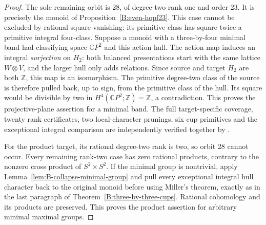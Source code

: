 \begin{proof}
The sole remaining orbit is 28, of degree-two rank one and order
23.  It is precisely the monoid of Proposition~\ref{B:even-hopf23}.
This case cannot be excluded by rational square-vanishing: its
primitive class has square twice a primitive integral four-class.
Suppose a monoid with a three-by-four minimal band had classifying
space $\mathbb CP^2$ and this action hull.  The action map induces
an integral \emph{surjection} on $H_2$: both balanced presentations
start with the same lattice $W\otimes V$, and the larger hull only
adds relations.  Since source and target $H_2$ are both $\mathbb Z$,
this map is an isomorphism.  The primitive degree-two class of the
source is therefore pulled back, up to sign, from the primitive
class of the hull.  Its square would be divisible by two in
$H^4(\mathbb CP^2;\mathbb Z)=\mathbb Z$, a contradiction.
This proves the projective-plane assertion for a minimal band.
The full target-specific coverage, twenty rank certificates, two
local-character prunings, six cup primitives and the exceptional
integral comparison are independently verified together by
.

For the product target, its rational degree-two rank is two, so
orbit 28 cannot occur.  Every remaining rank-two case has zero
rational products, contrary to the nonzero cross product of
$S^2\times S^2$.  If the minimal group is nontrivial, apply
Lemma~\ref{lem:B-collapse-minimal-group} and pull every exceptional
integral hull character back to the original monoid before using
Miller's theorem, exactly as in the last paragraph of
Theorem~\ref{B:three-by-three-cups}.  Rational cohomology and its
products are preserved.  This proves the product assertion for
arbitrary minimal maximal groups.
\end{proof}
